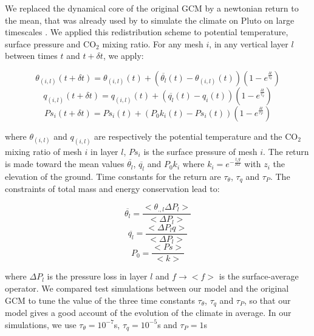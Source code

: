 We replaced the dynamical core of the original GCM by a newtonian return to the mean,
that was already  used by \cite{Bert:17} to simulate the climate on Pluto on large timescales
. We applied this redistribution scheme to potential temperature, surface
pressure and CO$_2$ mixing ratio. For any mesh $i$, in any vertical layer $l$ between times
$t$ and $t + \delta t$, we apply:

\begin{equation}
\label{rappel}
	\theta_{(i,l)}(t+\delta t) = \theta_{(i,l)}(t) + \left( \overline{\theta_{l}}(t) -  \theta_{(i,l)}(t) \right) \left( 1 - e^{\frac{\delta t}{\tau_\theta}} \right)
\end{equation}
\begin{equation}
	q_{(i,l)}(t+\delta t) = q_{(i,l)}(t) + \left( \overline{q_{l}}(t) -  q_i(t) \right) \left( 1 - e^{\frac{\delta t}{\tau_q}} \right)
\end{equation}
\begin{equation}
	Ps_i(t+\delta t) = Ps_i(t) + \left( P_0 k_i(t) -  Ps_i(t) \right) \left( 1 - e^{\frac{\delta t}{\tau_P}} \right)
\end{equation}

where $\theta_{(i,l)}$ and $q_{(i,l)}$ are respectively the potential temperature and the CO$_2$ 
mixing ratio of mesh $i$ in layer $l$, $Ps_i$ is the surface pressure of mesh $i$. The return is
made toward the mean values $\overline{\theta_{l}}$, $\overline{q_{l}}$ and $P_0 k_i$ where 
$k_i = e^{-\frac{z_i g}{RT}}$ with $z_i$ the elevation of the ground. Time constants for the 
return are $\tau_\theta$, $\tau_q$ and $\tau_P$. The constraints of total mass and energy
conservation lead to:

\begin{equation}
	\overline{\theta_{l}} = \frac{ <\theta_{.,l} \Delta P_{l}>}{< \Delta P_{l} >}
\end{equation}
\begin{equation}
	\overline{q_{l}} =  \frac{< \Delta P_{l} q >}{< \Delta P_{l} >}
\end{equation}
\begin{equation}
	P_0 = \frac{< Ps >}{< k >}
\end{equation}

where $\Delta P_{l}$ is the pressure loss in layer $l$ and $f \rightarrow < f >$ is the 
surface-average operator. We compared test simulations between our model and the original GCM 
to tune the value of the three time constants $\tau_\theta$, $\tau_q$ and $\tau_P$,
so that our model gives a good account of the evolution of the climate in average. In our
simulations, we use $\tau_\theta = 10^{-7}$s, $\tau_q = 10^{-5}$s and $\tau_P = 1$s


